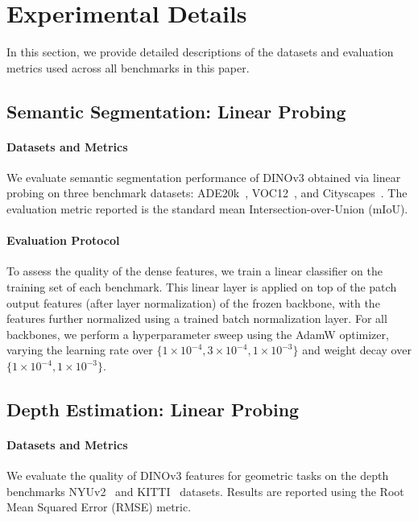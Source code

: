 \section{Experimental Details}

In this section, we provide detailed descriptions of the datasets and evaluation metrics used across all benchmarks in this paper.




\subsection{Semantic Segmentation: Linear Probing}
\label{app:exp-details:segmentation-probing}

\paragraph{Datasets and Metrics} 
We evaluate semantic segmentation performance of DINOv3 obtained via linear probing on three benchmark datasets: ADE20k~\citep{zhou2017scene}, VOC12~\citep{pascal-voc-2012}, and Cityscapes~\citep{cordts2016cityscapes}. The evaluation metric reported is the standard mean Intersection-over-Union (mIoU).

\paragraph{Evaluation Protocol} 
To assess the quality of the dense features, we train a linear classifier on the training set of each benchmark. This linear layer is applied on top of the patch output features (after layer normalization) of the frozen backbone, with the features further normalized using a trained batch normalization layer. For all backbones, we perform a hyperparameter sweep using the AdamW optimizer, varying the learning rate over \(\{1 \times 10^{-4}, 3 \times 10^{-4}, 1 \times 10^{-3}\}\) and weight decay over \(\{1 \times 10^{-4}, 1 \times 10^{-3}\}\).

\subsection{Depth Estimation: Linear Probing}
\label{app:exp-details:depth-probing}

\paragraph{Datasets and Metrics} 
We evaluate the quality of DINOv3 features for geometric tasks on the depth benchmarks NYUv2~\citep{silberman2012indoor} and KITTI~\citep{geiger2013vision} datasets. 
Results are reported using the Root Mean Squared Error (RMSE) metric.

